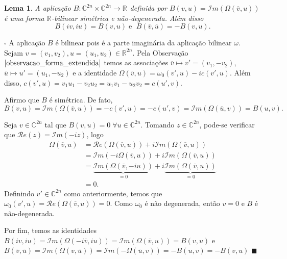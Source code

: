 \documentclass[12pt]{book}
\newtheorem{lema}[teorema]{Lema}
\newenvironment{prova}[1]{$\square$ #1}{\hfill$\blacksquare$}
\newcommand{\complexo}[1]{\mathbb{C}^{#1}}
\newcommand{\formaSimpleticaExtendida}[2]{\Omega(#1, #2)}
\newcommand{\formaSimpleticaPadrao}[2]{\omega_{0}(#1, #2)}
\newcommand{\parteImaginaria}[1]{\mathcal{I}m(#1)}
\newcommand{\parteReal}[1]{\mathcal{R}e(#1)}
\newcommand{\real}[1]{\mathbb{R}^{#1}}
\newcommand{\reta}{\real{}}
\begin{document}
		\begin{lema}
			A aplicação $B:\complexo{2n}\times \complexo{2n} \to \reta$ definida por $B(v, u ) = \parteImaginaria{\formaSimpleticaExtendida{\overline{v}}{u}}$ é uma forma $\reta$-bilinear simétrica e não-degenerada. Além disso
			$$
			B(iv,iu) = B(v,u)\;\text{e }\;B(\overline{v},\overline{u})=-B(v,u).
			$$
		\end{lema}
		\begin{prova}
		A aplicação $B$ é bilinear pois é a parte imaginária da aplicação bilinear $\omega$. Sejam $v = (v_{1},  v_{2}), u = (u_{1},  u_{2}) \in \real{2n}$. Pela Observação $\ref{observacao_forma_extendida}$ temos as associações $\overline{v}\mapsto v' = (v_{1}, -v_{2})$,  $\overline{u}\mapsto u' = (u_{1}, -u_{2})$ e a identidade $\formaSimpleticaExtendida{\overline{v}}{u} = \formaSimpleticaPadrao{v'}{u} -ic(v',u)$. Além disso, $c(v',u) = v_{1}u_{1} - v_{2}u_{2} = u_{1}v_{1} - u_{2}v_{2} = c(u',v)$. 
		
		Afirmo que $B$ é simétrica. De fato,
		$$B(v,u) =\parteImaginaria{\formaSimpleticaExtendida{\overline{v}}{u}} =-c(v',u) = -c(u',v) = \parteImaginaria{\formaSimpleticaExtendida{\overline{u}}{v}} = B(u,v).
		$$
		
		Seja $v \in \complexo{2n}$ tal que $B(v, u) = 0 \; \forall u \in \complexo{2n}$. Tomando $z \in \complexo{2n}$, pode-se verificar que $\parteReal{z} = \parteImaginaria{-iz}$, logo 
		$$
			\begin{aligned}
			\formaSimpleticaExtendida{\overline{v}}{u} &=\parteReal{\formaSimpleticaExtendida{\overline{v}}{u}} +i \parteImaginaria{\formaSimpleticaExtendida{\overline{v}}{u}} 
			\\
			&= \parteImaginaria{-i\formaSimpleticaExtendida{\overline{v}}{u}} +i \parteImaginaria{\formaSimpleticaExtendida{\overline{v}}{u}}
			\\
			&= \underbrace{\parteImaginaria{\formaSimpleticaExtendida{\overline{v}}{-iu}}}_{=0} +i \underbrace{\parteImaginaria{\formaSimpleticaExtendida{\overline{v}}{u}}}_{=0}
			\\
			&=0.
			\end{aligned}
		$$
		 Definindo $v'\in \complexo{2n}$ como anteriormente, temos que $\formaSimpleticaPadrao{v'}{u} = \parteReal{\formaSimpleticaExtendida{\overline{v}}{u}} = 0$. Como $\omega_{0}$ é não degenerada, então $v = 0$ e $B$ é não-degenerada.
		
		Por fim, temos as identidades $B(iv,iu) = \parteImaginaria{\formaSimpleticaExtendida{-i\overline{v}}{iu}}= \parteImaginaria{\formaSimpleticaExtendida{\overline{v}}{u}}=B(v,u)$ e $B(\overline{v},\overline{u})  = \parteImaginaria{\formaSimpleticaExtendida{v}{\overline{u}}} = \parteImaginaria{-\formaSimpleticaExtendida{\overline{u}}{v}} = -B(u,v) = -B(v,u)$
		\end{prova}
	
\end{document}
